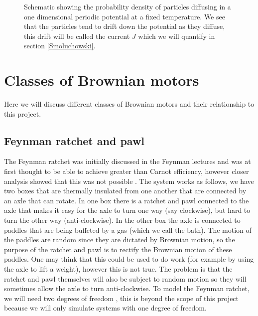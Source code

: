 \begin{figure}[tb]
	\centering
\quad
\caption{Schematic showing the probability density of particles diffusing in a one dimensional periodic potential at a fixed temperature. We see that the particles tend to drift down the potential as they diffuse, this drift will be called the current $J$ which we will quantify in section \ref{Smoluchowski}.}
\label{fig:Schematic}
\end{figure}

\section{Classes of Brownian motors} \label{BrownianMotorClasses}
Here we will discuss different classes of Brownian motors and their relationship to this project.

\subsection{Feynman ratchet and pawl}
The Feynman ratchet was initially discussed in the Feynman lectures \cite{Feynman1963} and was at first thought to be able to achieve greater than Carnot efficiency, however closer analysis showed that this was not possible \cite{ParrondoEspanol1996}. The system works as follows, we have two boxes that are thermally insulated from one another that are connected by an axle that can rotate. In one box there is a ratchet and pawl connected to the axle that makes it easy for the axle to turn one way (say clockwise), but hard to turn the other way (anti-clockwise). In the other box the axle is connected to paddles that are being buffeted by a gas (which we call the bath). The motion of the paddles are random since they are dictated by Brownian motion, so the purpose of the ratchet and pawl is to rectify the Brownian motion of these paddles. One may think that this could be used to do work (for example by using the axle to lift a weight), however this is not true. The problem is that the ratchet and pawl themselves will also be subject to random motion so they will sometimes allow the axle to turn anti-clockwise. To model the Feynman ratchet, we will need two degrees of freedom \cite{M.W.Jack2016}, this is beyond the scope of this project because we will only simulate systems with one degree of freedom.

